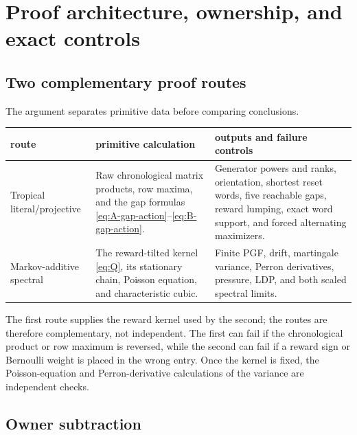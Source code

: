 \section{Proof architecture, ownership, and exact controls}
\label{sec:scope}

\subsection{Two complementary proof routes}

The argument separates primitive data before comparing conclusions.
\begin{center}
\small
\renewcommand{\arraystretch}{1.14}
\begin{tabular}{>{\raggedright\arraybackslash}p{}
                >{\raggedright\arraybackslash}p{}
                >{\raggedright\arraybackslash}p{}}
\toprule
route & primitive calculation & outputs and failure controls\\
\midrule
Tropical literal/projective
& Raw chronological matrix products, row maxima, and the gap formulas
  \eqref{eq:A-gap-action}--\eqref{eq:B-gap-action}.
& Generator powers and ranks, orientation, shortest reset words, five
  reachable gaps, reward lumping, exact word support, and forced alternating
  maximizers.\\
Markov-additive spectral
& The reward-tilted kernel \eqref{eq:Q}, its stationary chain, Poisson
  equation, and characteristic cubic.
& Finite PGF, drift, martingale variance, Perron derivatives, pressure, LDP,
  and both scaled spectral limits.\\
\bottomrule
\end{tabular}
\end{center}
The first route supplies the reward kernel used by the second; the routes
are therefore complementary, not independent.  The first can fail if the
chronological product or row maximum is reversed, while the second can fail
if a reward sign or Bernoulli weight is placed in the wrong entry.  Once the
kernel is fixed, the Poisson-equation and Perron-derivative calculations of
the variance are independent checks.

\subsection{Owner subtraction}

